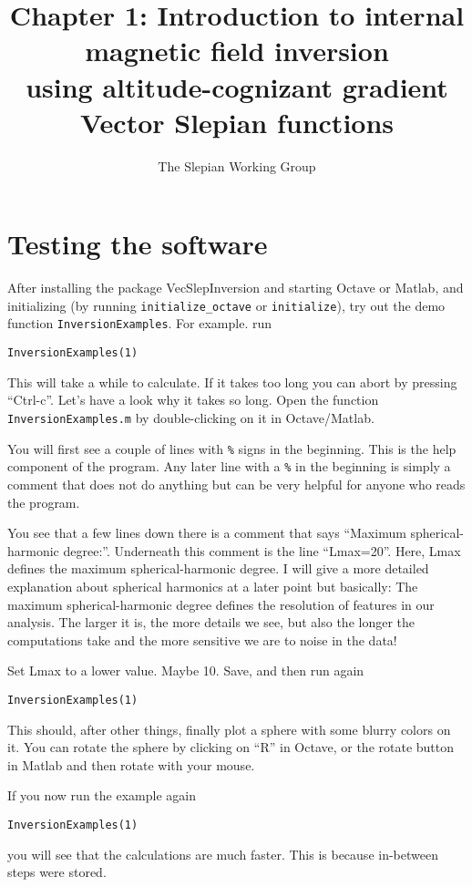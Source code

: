 \documentclass[11pt]{article}
\title{Chapter 1: Introduction to internal magnetic field inversion\\
  using altitude-cognizant gradient Vector Slepian functions}
\author{The Slepian Working Group}
\begin{document}
\maketitle


\section{Testing the software}

After installing the package VecSlepInversion and starting Octave or
Matlab, and initializing (by running \verb+initialize_octave+ or
\verb+initialize+), try out the demo function
\verb+InversionExamples+. For example. run

\verb+InversionExamples(1)+

This will take a while to calculate. If it takes too long you can
abort by pressing ``Ctrl-c''. Let's have a look why it takes so
long. Open the function \verb+InversionExamples.m+ by double-clicking
on it in Octave/Matlab.

You will first see a couple of lines with \verb+%+ signs in the
beginning. This is the help component of the program. Any later line
with a \verb+%+ in the beginning is simply a comment that does not do
anything but can be very helpful for anyone who reads the program.

You see that a few lines down there is a comment that says ``Maximum
spherical-harmonic degree:''. Underneath this comment is the line
``Lmax=20''. Here, Lmax defines the maximum spherical-harmonic
degree. I will give a more detailed explanation about spherical
harmonics at a later point but basically: The maximum
spherical-harmonic degree defines the resolution of features in our
analysis. The larger it is, the more details we see, but also the
longer the computations take and the more sensitive we are to noise in
the data!

Set Lmax to a lower value. Maybe 10. Save, and then run again

\qquad \verb+InversionExamples(1)+

This should, after other things, finally plot a sphere with some
blurry colors on it. You can rotate the sphere by clicking on ``R'' in
Octave, or the rotate button in Matlab and then rotate with your mouse.

If you now run the example again

\qquad \verb+InversionExamples(1)+

you will see that the calculations are much faster. This is because
in-between steps were stored.
\end{document}
